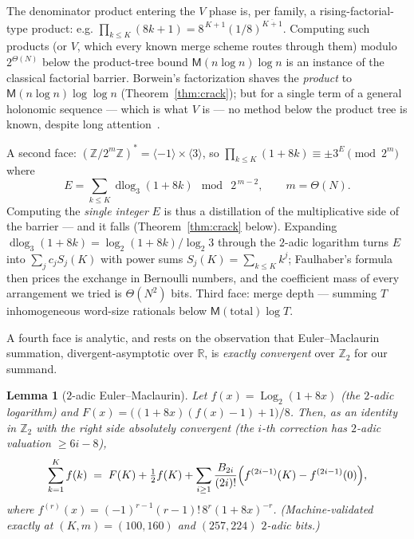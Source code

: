 \documentclass[11pt]{article}
\newtheorem{lemma}[theorem]{Lemma}
\theoremstyle{remark}
\theoremstyle{definition}
\newcommand{\M}{\mathsf{M}}
\newcommand{\Z}{\mathbb{Z}}
\begin{document}
The denominator product entering the $V$ phase is, per family, a
rising-factorial-type product: e.g.
$\prod_{k\le K}(8k+1)=8^{\,K+1}(1/8)^{\overline{K+1}}$. Computing such
products (or $V$, which every known merge scheme routes through them)
modulo $2^{\Theta(N)}$ below the product-tree bound
$\M(n\log n)\log n$ is an instance of the classical factorial barrier.
Borwein's factorization shaves the \emph{product} to $\M(n\log n)\log\log n$
(Theorem~\ref{thm:crack}); but for a single term of a general holonomic
sequence --- which is what $V$ is --- no method below the product tree is
known, despite long attention~\cite{Borwein85,Strassen77,BGS07}.

A second face: $(\Z/2^{m}\Z)^{*}=\langle-1\rangle\times\langle3\rangle$,
so $\prod_{k\le K}(1+8k)\equiv\pm 3^{E}\pmod{2^{m}}$ where
\[
E=\sum_{k\le K}\operatorname{dlog}_3(1+8k)\ \bmod\ 2^{\,m-2},
\qquad m=\Theta(N).
\]
Computing the \emph{single integer} $E$ is thus a distillation of the
multiplicative side of the barrier --- and it falls
(Theorem~\ref{thm:crack} below). Expanding
$\operatorname{dlog}_3(1+8k)=\log_2(1+8k)/\log_2 3$ through the $2$-adic
logarithm turns $E$ into $\sum_j c_j S_j(K)$ with power sums
$S_j(K)=\sum_{k\le K}k^{j}$; Faulhaber's formula then prices the exchange
in Bernoulli numbers, and the coefficient mass of every arrangement we
tried is $\Theta(N^{2})$ bits. Third face: merge depth --- summing $T$
inhomogeneous word-size rationals below $\M(\text{total})\log T$.

A fourth face is analytic, and rests on the observation that
Euler--Maclaurin summation, divergent-asymptotic over $\mathbb{R}$, is
\emph{exactly convergent} over $\Z_2$ for our summand.

\begin{lemma}[$2$-adic Euler--Maclaurin]\label{lem:em}
Let $f(x)=\operatorname{Log}_2(1+8x)$ (the $2$-adic logarithm) and
$F(x)=\bigl((1+8x)(f(x)-1)+1\bigr)/8$. Then, as an identity in $\Z_2$
with the right side absolutely convergent (the $i$-th correction has
$2$-adic valuation $\ge 6i-8$),
\[
\sum_{k=1}^{K}f(k)\;=\;F(K)+\tfrac{1}{2}f(K)
+\sum_{i\ge1}\frac{B_{2i}}{(2i)!}
\Bigl(f^{(2i-1)}(K)-f^{(2i-1)}(0)\Bigr),
\]
where $f^{(r)}(x)=(-1)^{r-1}(r-1)!\,8^{r}(1+8x)^{-r}$.
(Machine-validated exactly at $(K,m)=(100,160)$ and $(257,224)$ $2$-adic
bits.)
\end{lemma}
\end{document}
